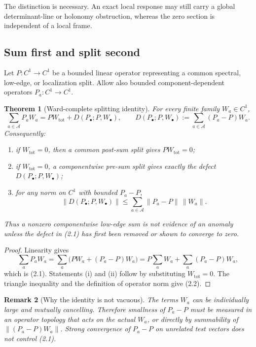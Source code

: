 \documentclass[11pt]{article}
\newtheorem{theorem}{Theorem}[section]
\newtheorem{remark}[theorem]{Remark}
\begin{document}
The distinction is necessary.  An exact local response may still carry a
global determinant-line or holonomy obstruction, whereas the zero section
is independent of a local frame.

\subsection{Sum first and split second}

Let \(P:C^1\to C^1\) be a bounded linear operator representing a common
spectral, low-edge, or localization split.  Allow also bounded
component-dependent operators \(P_a:C^1\to C^1\).

\begin{theorem}[Ward-complete splitting identity]
\label{thm:v11v2-sum-first}
For every finite family \(W_a\in C^1\),
\[
 \sum_{a\in\mathscr A}P_aW_a
 =
 P W_{\mathrm{tot}}+
 D(P_\bullet;P,W_\bullet),
 \qquad
 D(P_\bullet;P,W_\bullet)
 :=
 \sum_{a\in\mathscr A}(P_a-P)W_a.
 \tag{2.1}
\]
Consequently:
\begin{enumerate}[label=\textnormal{(\roman*)}]
\item if \(W_{\mathrm{tot}}=0\), then a common post-sum split gives
\(P W_{\mathrm{tot}}=0\);
\item if \(W_{\mathrm{tot}}=0\), a componentwise pre-sum split gives exactly
the defect \(D(P_\bullet;P,W_\bullet)\);
\item for any norm on \(C^1\) with bounded \(P_a-P\),
\[
 \|D(P_\bullet;P,W_\bullet)\|
 \leq
 \sum_{a\in\mathscr A}\|P_a-P\|\,\|W_a\|.
 \tag{2.2}
\]
\end{enumerate}
Thus a nonzero componentwise low-edge sum is not evidence of an anomaly
unless the defect in (2.1) has first been removed or shown to converge to
zero.
\end{theorem}

\begin{proof}
Linearity gives
\[
 \sum_aP_aW_a
 =
 \sum_a\bigl(PW_a+(P_a-P)W_a\bigr)
 =
 P\sum_aW_a+\sum_a(P_a-P)W_a,
\]
which is (2.1).  Statements (i) and (ii) follow by substituting
\(W_{\mathrm{tot}}=0\).  The triangle inequality and the definition of
operator norm give (2.2).
\end{proof}

\begin{remark}[Why the identity is not vacuous]
\label{rem:v11v2-not-vacuous}
The terms \(W_a\) can be individually large and mutually cancelling.
Therefore smallness of \(P_a-P\) must be measured in an operator topology
that acts on the actual \(W_a\), or directly by summability of
\(\|(P_a-P)W_a\|\).  Strong convergence of \(P_a-P\) on unrelated test
vectors does not control (2.1).
\end{remark}
\end{document}
